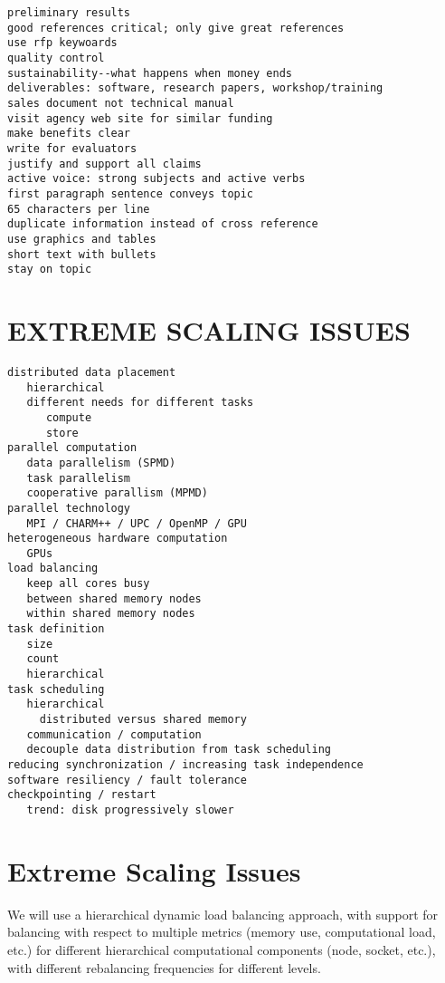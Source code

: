 \documentclass[14pt,letter]{article}
\begin{document}
\begin{verbatim}
preliminary results
good references critical; only give great references
use rfp keywoards
quality control
sustainability--what happens when money ends
deliverables: software, research papers, workshop/training
sales document not technical manual
visit agency web site for similar funding
make benefits clear
write for evaluators
justify and support all claims
active voice: strong subjects and active verbs
first paragraph sentence conveys topic
65 characters per line
duplicate information instead of cross reference
use graphics and tables
short text with bullets
stay on topic
\end{verbatim}

\section{EXTREME SCALING ISSUES} \label{s:issues}

\begin{verbatim}
distributed data placement
   hierarchical
   different needs for different tasks
      compute
      store
parallel computation
   data parallelism (SPMD)
   task parallelism
   cooperative parallism (MPMD)
parallel technology
   MPI / CHARM++ / UPC / OpenMP / GPU
heterogeneous hardware computation
   GPUs
load balancing
   keep all cores busy
   between shared memory nodes
   within shared memory nodes
task definition
   size
   count
   hierarchical
task scheduling
   hierarchical
     distributed versus shared memory
   communication / computation
   decouple data distribution from task scheduling
reducing synchronization / increasing task independence
software resiliency / fault tolerance
checkpointing / restart
   trend: disk progressively slower
\end{verbatim}

\section{Extreme Scaling Issues} \label{s:scaling}



We will use a hierarchical dynamic load balancing approach, with
support for balancing with respect to multiple metrics (memory use,
computational load, etc.) for different hierarchical computational
components (node, socket, etc.), with different rebalancing
frequencies for different levels.
\end{document}
